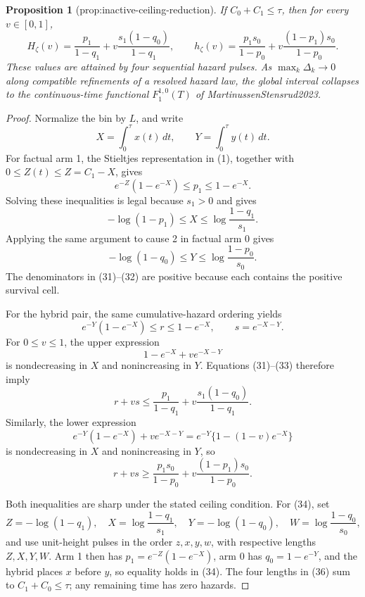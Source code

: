 \documentclass{article}
\newtheorem{proposition}{Proposition}
\begin{document}
\begin{proposition}[prop:inactive-ceiling-reduction]\label{prop:inactive-ceiling-reduction}
If \(C_0+C_1\le\tau\), then for every \(v\in[0,1]\), \[H_{\zeta}(v)=\frac{p_1}{1-q_1}+v\frac{s_1(1-q_0)}{1-q_1},\qquad h_{\zeta}(v)=\frac{p_1s_0}{1-p_0}+v\frac{(1-p_1)s_0}{1-p_0}.\] These values are attained by four sequential hazard pulses. As \(\max_k\Delta_k\to0\) along compatible refinements of a resolved hazard law, the global interval collapses to the continuous-time functional \(F_1^{1,0}(T)\) of MartinussenStensrud2023.
\end{proposition}
\begin{proof}
Normalize the bin by \(L\), and write
\[
 X=\int_0^\tau x(t)\,dt,\quad\quad Y=\int_0^\tau y(t)\,dt.
\]
For factual arm 1, the Stieltjes representation in (1), together with \(0\le Z(t)\le Z=C_1-X\), gives
\[
 e^{-Z}(1-e^{-X})\le p_1\le1-e^{-X}.
\]
Solving these inequalities is legal because \(s_1>0\) and gives
\[
 -\log(1-p_1)\le X\le\log\frac{1-q_1}{s_1}.                \tag{31}
\]
Applying the same argument to cause 2 in factual arm 0 gives
\[
 -\log(1-q_0)\le Y\le\log\frac{1-p_0}{s_0}.                \tag{32}
\]
The denominators in (31)--(32) are positive because each contains the positive survival cell.

For the hybrid pair, the same cumulative-hazard ordering yields
\[
 e^{-Y}(1-e^{-X})\le r\le1-e^{-X},
 \quad\quad s=e^{-X-Y}.                                         \tag{33}
\]
For \(0\le v\le1\), the upper expression
\[
 1-e^{-X}+ve^{-X-Y}
\]
is nondecreasing in \(X\) and nonincreasing in \(Y\).  Equations (31)--(33) therefore imply
\[
 r+vs\le \frac{p_1}{1-q_1}
          +v\frac{s_1(1-q_0)}{1-q_1}.                       \tag{34}
\]
Similarly, the lower expression
\[
 e^{-Y}(1-e^{-X})+ve^{-X-Y}
 =e^{-Y}\{1-(1-v)e^{-X}\}
\]
is nondecreasing in \(X\) and nonincreasing in \(Y\), so
\[
 r+vs\ge \frac{p_1s_0}{1-p_0}
          +v\frac{(1-p_1)s_0}{1-p_0}.                       \tag{35}
\]

Both inequalities are sharp under the stated ceiling condition.  For (34), set
\[
 Z=-\log(1-q_1),\quad X=\log\frac{1-q_1}{s_1},\quad
 Y=-\log(1-q_0),\quad W=\log\frac{1-q_0}{s_0},              \tag{36}
\]
and use unit-height pulses in the order \(z,x,y,w\), with respective lengths \(Z,X,Y,W\).  Arm 1 then has \(p_1=e^{-Z}(1-e^{-X})\), arm 0 has \(q_0=1-e^{-Y}\), and the hybrid places \(x\) before \(y\), so equality holds in (34).  The four lengths in (36) sum to \(C_1+C_0\le\tau\); any remaining time has zero hazards.


\end{proof}
\end{document}
